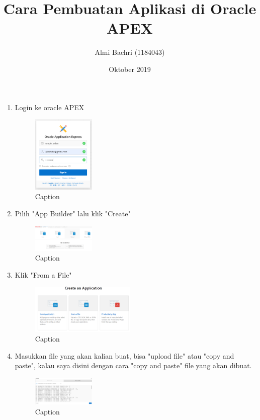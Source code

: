\documentclass{article}
\title{Cara Pembuatan Aplikasi di Oracle APEX}
\author{Almi Bachri (1184043) }
\date{Oktober 2019}
\begin{document}
\maketitle
\begin{enumerate}
    \item Login ke oracle APEX
    \begin{figure}[!htbp]
        \centering
        \includegraphics [width=3cm]{figure/Capture.PNG}
        \caption{Caption}
        \label{fig:my_label}
    \end{figure}
    
    \item Pilih "App Builder" lalu klik "Create"
     \begin{figure}[!htbp]
        \centering
        \includegraphics [width=3cm]{figure/Capture1.PNG}
        \caption{Caption}
        \label{fig:my_label}
    \end{figure}
    
    \item Klik "From a File"
     \begin{figure}[!htbp]
        \centering
        \includegraphics [width=5cm]{figure/Capture2.PNG}
        \caption{Caption}
        \label{fig:my_label}
    \end{figure}
    
    \item Masukkan file yang akan kalian buat, bisa "upload file" atau "copy and paste", kalau saya disini dengan cara "copy and paste" file yang akan dibuat.
     \begin{figure}[!htbp]
        \centering
        \includegraphics [width=3cm]{figure/Capture3.PNG}
        \caption{Caption}
        \label{capture3}
    \end{figure}
    

\end{enumerate}
\end{document}
